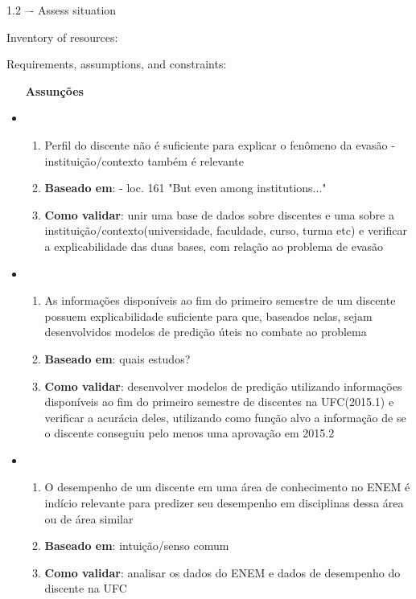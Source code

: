 \documentclass{article}
\begin{document}
1.2 –- Assess situation

Inventory of resources:

Requirements, assumptions, and constraints:

\begin{itemize}
\item [\textbf{Assunções}]
\item 
	\begin{enumerate}
	\item Perfil do discente não é suficiente para explicar o fenômeno da evasão - instituição/contexto também é relevante
	\item \textbf{Baseado em}: \cite{tinto_leaving} - loc. 161 "But even among institutions..."
	\item \textbf{Como validar}: unir uma base de dados sobre discentes e uma sobre a instituição/contexto(universidade, faculdade, curso, turma etc) e verificar a explicabilidade das duas bases, com relação ao problema de evasão
	\end{enumerate}

\item 
	\begin{enumerate}
	\item As informações disponíveis ao fim do primeiro semestre de um discente possuem explicabilidade suficiente para que, baseados nelas, sejam desenvolvidos modelos de predição úteis no combate ao problema
	\item \textbf{Baseado em}: quais estudos? \cite{tinto_completing} 
	\item \textbf{Como validar}: desenvolver modelos de predição utilizando informações disponíveis ao fim do primeiro semestre de discentes na UFC(2015.1) e verificar a acurácia deles, utilizando como função alvo a informação de se o discente conseguiu pelo menos uma aprovação em 2015.2
	\end{enumerate}

\item 
	\begin{enumerate}
	\item O desempenho de um discente em uma área de conhecimento no ENEM é indício relevante para predizer seu desempenho em disciplinas dessa área ou de área similar
	\item \textbf{Baseado em}: intuição/senso comum
	\item \textbf{Como validar}: analisar os dados do ENEM e dados de desempenho do discente na UFC
	\end{enumerate}
	

\end{itemize}
\end{document}
